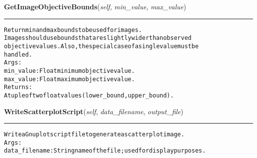     \label{coinor:grumpy:BB:BBTree:GetImageObjectiveBounds}

    \vspace{0.5ex}

\hspace{.8\funcindent}\begin{boxedminipage}{\funcwidth}

    \raggedright \textbf{GetImageObjectiveBounds}(\textit{self}, \textit{min\_value}, \textit{max\_value})

    \vspace{-1.5ex}

    \rule{\textwidth}{0.5\fboxrule}
\setlength{\parskip}{2ex}
\begin{alltt}

Return min and max bounds to be used for images.
Images should use bounds that are slightly wider than observed
objective values.  Also, the special case of a single value must be
handled.
Args:
  min\_value: Float minimum objective value.
  max\_value: Float maximum objective value.
Returns:
  A tuple of two float values (lower\_bound, upper\_bound).
\end{alltt}

\setlength{\parskip}{1ex}
    \end{boxedminipage}

    \label{coinor:grumpy:BB:BBTree:WriteScatterplotScript}

    \vspace{0.5ex}

\hspace{.8\funcindent}\begin{boxedminipage}{\funcwidth}

    \raggedright \textbf{WriteScatterplotScript}(\textit{self}, \textit{data\_filename}, \textit{output\_file})

    \vspace{-1.5ex}

    \rule{\textwidth}{0.5\fboxrule}
\setlength{\parskip}{2ex}
\begin{alltt}

Write a Gnuplot script file to generate a scatterplot image.
Args:
  data\_filename: String name of the file; used for display purposes.
\end{alltt}

\setlength{\parskip}{1ex}
    \end{boxedminipage}

